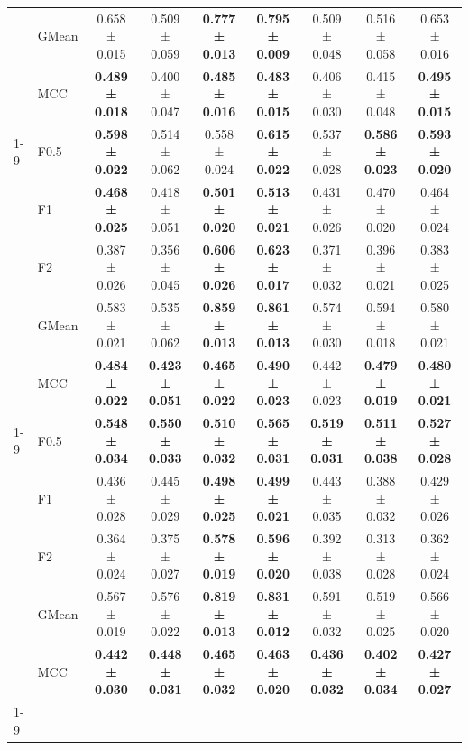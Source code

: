 \begin{table}[H]
{\begin{tabular}{llccccccc}
 & GMean & 0.658 ± 0.015 & 0.509 ± 0.059 & \textbf{0.777 ± 0.013} & \textbf{0.795 ± 0.009} & 0.509 ± 0.048 & 0.516 ± 0.058 & 0.653 ± 0.016 \\
 & MCC & \textbf{0.489 ± 0.018} & 0.400 ± 0.047 & \textbf{0.485 ± 0.016} & \textbf{0.483 ± 0.015} & 0.406 ± 0.030 & 0.415 ± 0.048 & \textbf{0.495 ± 0.015} \\
\cline{1-9}
\multirow[t]{5}{*}{TabPFN} & F0.5 & \textbf{0.598 ± 0.022} & 0.514 ± 0.062 & 0.558 ± 0.024 & \textbf{0.615 ± 0.022} & 0.537 ± 0.028 & \textbf{0.586 ± 0.023} & \textbf{0.593 ± 0.020} \\
 & F1 & \textbf{0.468 ± 0.025} & 0.418 ± 0.051 & \textbf{0.501 ± 0.020} & \textbf{0.513 ± 0.021} & 0.431 ± 0.026 & 0.470 ± 0.020 & 0.464 ± 0.024 \\
 & F2 & 0.387 ± 0.026 & 0.356 ± 0.045 & \textbf{0.606 ± 0.026} & \textbf{0.623 ± 0.017} & 0.371 ± 0.032 & 0.396 ± 0.021 & 0.383 ± 0.025 \\
 & GMean & 0.583 ± 0.021 & 0.535 ± 0.062 & \textbf{0.859 ± 0.013} & \textbf{0.861 ± 0.013} & 0.574 ± 0.030 & 0.594 ± 0.018 & 0.580 ± 0.021 \\
 & MCC & \textbf{0.484 ± 0.022} & \textbf{0.423 ± 0.051} & \textbf{0.465 ± 0.022} & \textbf{0.490 ± 0.023} & 0.442 ± 0.023 & \textbf{0.479 ± 0.019} & \textbf{0.480 ± 0.021} \\
\cline{1-9}
\multirow[t]{5}{*}{XGBoost} & F0.5 & \textbf{0.548 ± 0.034} & \textbf{0.550 ± 0.033} & \textbf{0.510 ± 0.032} & \textbf{0.565 ± 0.031} & \textbf{0.519 ± 0.031} & \textbf{0.511 ± 0.038} & \textbf{0.527 ± 0.028} \\
 & F1 & 0.436 ± 0.028 & 0.445 ± 0.029 & \textbf{0.498 ± 0.025} & \textbf{0.499 ± 0.021} & 0.443 ± 0.035 & 0.388 ± 0.032 & 0.429 ± 0.026 \\
 & F2 & 0.364 ± 0.024 & 0.375 ± 0.027 & \textbf{0.578 ± 0.019} & \textbf{0.596 ± 0.020} & 0.392 ± 0.038 & 0.313 ± 0.028 & 0.362 ± 0.024 \\
 & GMean & 0.567 ± 0.019 & 0.576 ± 0.022 & \textbf{0.819 ± 0.013} & \textbf{0.831 ± 0.012} & 0.591 ± 0.032 & 0.519 ± 0.025 & 0.566 ± 0.020 \\
 & MCC & \textbf{0.442 ± 0.030} & \textbf{0.448 ± 0.031} & \textbf{0.465 ± 0.032} & \textbf{0.463 ± 0.020} & \textbf{0.436 ± 0.032} & \textbf{0.402 ± 0.034} & \textbf{0.427 ± 0.027} \\
\cline{1-9}
\bottomrule
\end{tabular}
    }
\end{table}
